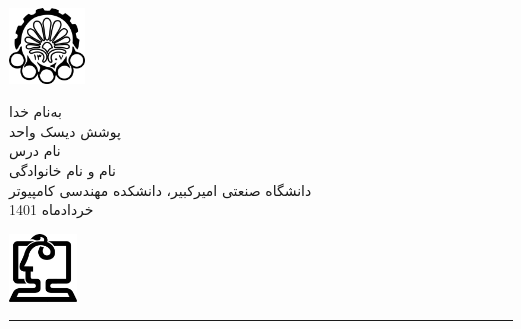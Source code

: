 \begin{minipage}{0.1\textwidth}
\includegraphics[width=2cm]{etc/aut}
\end{minipage}%
\hfill%
\begin{minipage}{0.6\textwidth}\centering
\fontsize{10pt}{10pt}\selectfont
به‌نام خدا \\
پوشش دیسک واحد \\
نام درس \\
نام و نام خانوادگی \\
\vspace{0.25cm}
\begingroup
\fontsize{8pt}{8pt}\selectfont
دانشگاه صنعتی امیرکبیر، دانشکده مهندسی کامپیوتر \\
خردادماه 1401 \\
\endgroup
\end{minipage}%
\hfill%
\begin{minipage}{0.1\textwidth}
\includegraphics[width=1.8cm]{etc/ce}
\end{minipage}

\vspace{0.5cm}

\noindent\rule{\textwidth}{1pt}